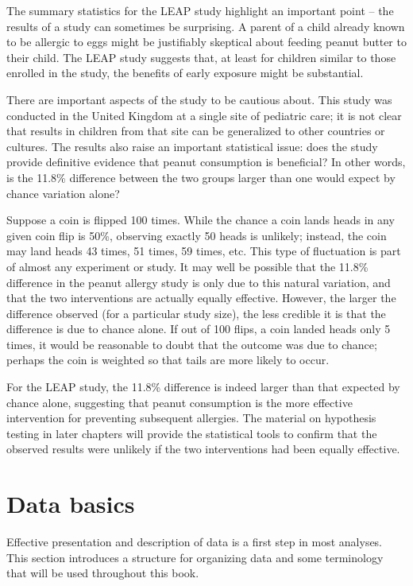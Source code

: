 The summary statistics for the LEAP study highlight an important point -- the results of a study can sometimes be surprising.  A parent of a child already known to be allergic to eggs might be justifiably skeptical about feeding peanut butter to their child.  The LEAP study suggests that, at least for children similar to those enrolled in the study, the benefits of early exposure might be substantial. 

There are important aspects of the study to be cautious about.  This study was conducted in the United Kingdom at a single site of pediatric care; it is not clear that results in children from that site can be generalized to other countries or cultures. The results also raise an important statistical issue: does the study provide definitive evidence that peanut consumption is beneficial? In other words, is the 11.8\% difference between the two groups larger than one would expect by chance variation alone? 

Suppose a coin is flipped 100 times. While the chance a coin lands heads in any given coin flip is 50\%, observing exactly 50 heads is unlikely; instead, the coin may land heads 43 times, 51 times, 59 times, etc. This type of fluctuation is part of almost any experiment or study. It may well be possible that the 11.8\% difference in the peanut allergy study is only due to this natural variation, and that the two interventions are actually equally effective. However, the larger the difference observed (for a particular study size), the less credible it is that the difference is due to chance alone. If out of 100 flips, a coin landed heads only 5 times, it would be reasonable to doubt that the outcome was due to chance; perhaps the coin is weighted so that tails are more likely to occur.

For the LEAP study, the 11.8\% difference is indeed larger than that expected by chance alone, suggesting that peanut consumption is the more effective intervention for preventing subsequent allergies. The material on hypothesis testing in later chapters will provide the statistical tools to confirm that the observed results were unlikely if the two interventions had been equally effective.



\section{Data basics}
\label{dataBasics}

Effective presentation and description of data is a first step in most analyses. This section introduces a structure for organizing data and some terminology that will be used throughout this book.


